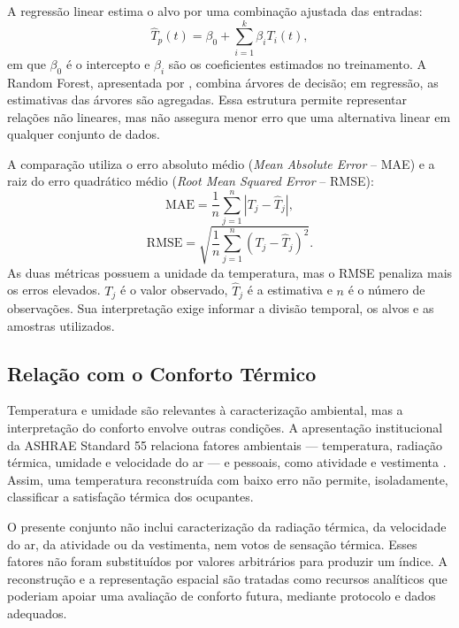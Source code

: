 A regressão linear estima o alvo por uma combinação ajustada das entradas:
\begin{equation}
    \widehat{T}_p(t)=\beta_0+\sum_{i=1}^{k}\beta_iT_i(t),
    \label{eq:regressao_linear}
\end{equation}
em que $\beta_0$ é o intercepto e $\beta_i$ são os coeficientes estimados
no treinamento. A Random Forest, apresentada por
, combina árvores de decisão; em regressão,
as estimativas das árvores são agregadas. Essa estrutura permite
representar relações não lineares, mas não assegura menor erro que
uma alternativa linear em qualquer conjunto de dados.

A comparação utiliza o erro absoluto médio (\textit{Mean Absolute
Error} -- MAE) e a raiz do erro quadrático médio (\textit{Root Mean
Squared Error} -- RMSE):
\begin{equation}
    \mathrm{MAE}=\frac{1}{n}\sum_{j=1}^{n}|T_j-\widehat{T}_j|,
    \label{eq:mae}
\end{equation}
\begin{equation}
    \mathrm{RMSE}=\sqrt{\frac{1}{n}
    \sum_{j=1}^{n}(T_j-\widehat{T}_j)^2}.
    \label{eq:rmse}
\end{equation}
As duas métricas possuem a unidade da temperatura, mas o RMSE penaliza
mais os erros elevados. $T_j$ é o valor observado, $\widehat{T}_j$ é a
estimativa e $n$ é o número de observações. Sua interpretação exige
informar a divisão temporal, os alvos e as amostras utilizados.

\subsection{Relação com o Conforto Térmico}
\label{subsec:conforto_termico}

Temperatura e umidade são relevantes à caracterização ambiental,
mas a interpretação do conforto envolve outras condições. A apresentação
institucional da ASHRAE Standard 55 relaciona fatores ambientais
--- temperatura, radiação térmica, umidade e velocidade do ar ---
e pessoais, como atividade e vestimenta \cite{ashrae55overview}.
Assim, uma temperatura reconstruída com baixo erro não permite,
isoladamente, classificar a satisfação térmica dos ocupantes.

O presente conjunto não inclui caracterização da radiação térmica,
da velocidade do ar, da atividade ou da vestimenta, nem votos de
sensação térmica. Esses fatores não foram substituídos por valores
arbitrários para produzir um índice. A reconstrução e a representação
espacial são tratadas como recursos analíticos que poderiam apoiar
uma avaliação de conforto futura, mediante protocolo e dados adequados.

